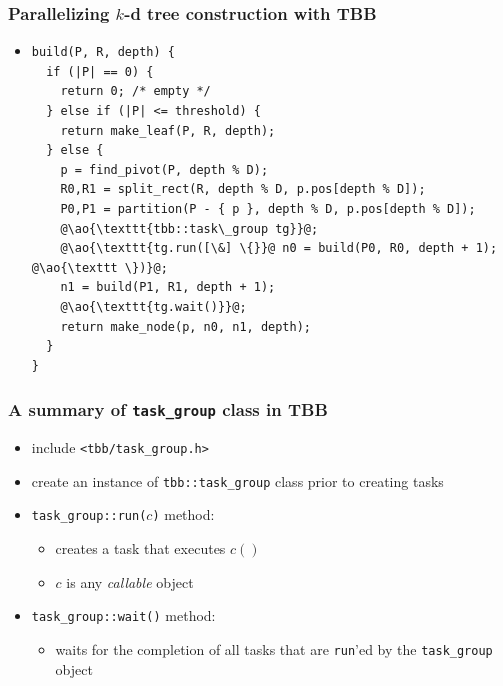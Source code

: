 \documentclass[12pt,dvipdfmx]{beamer}
\newcommand{\ao}[1]{{\color{blue}#1}}
\begin{document}
\begin{frame}[fragile]
\frametitle{Parallelizing $k$-d tree construction with TBB}
\begin{itemize}
\item []
\begin{lstlisting}
build(P, R, depth) {
  if (|P| == 0) {
    return 0; /* empty */
  } else if (|P| <= threshold) {
    return make_leaf(P, R, depth);
  } else {
    p = find_pivot(P, depth % D);
    R0,R1 = split_rect(R, depth % D, p.pos[depth % D]);
    P0,P1 = partition(P - { p }, depth % D, p.pos[depth % D]);
    @\ao{\texttt{tbb::task\_group tg}}@;
    @\ao{\texttt{tg.run([\&] \{}}@ n0 = build(P0, R0, depth + 1); @\ao{\texttt \})}@;
    n1 = build(P1, R1, depth + 1);
    @\ao{\texttt{tg.wait()}}@;
    return make_node(p, n0, n1, depth);
  }
}
\end{lstlisting}
\end{itemize}
\end{frame}


\begin{frame}[fragile]
\frametitle{A summary of \texttt{task\_group} class in TBB}

\begin{itemize}
\item include \ao{\tt <tbb/task\_group.h>}
\item create an instance of {\tt tbb::task\_group} class
  prior to creating tasks
\item \ao{\tt task\_group::run($c$)} method:
  \begin{itemize}
  \item creates a task that executes $c()$
  \item $c$ is any \ao{\em callable} object
  \end{itemize}
\item \ao{\tt task\_group::wait()} method:
  \begin{itemize}
  \item waits for the completion of all tasks
    that are {\tt run}'ed by the {\tt task\_group} object
  \end{itemize}
\end{itemize}
\end{frame}
\end{document}
